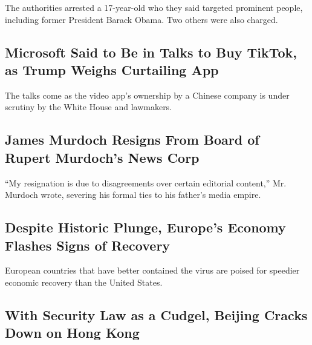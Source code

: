 The authorities arrested a 17-year-old who they said targeted prominent
people, including former President Barack Obama. Two others were also
charged.

\href{/2020/07/31/technology/tiktok-microsoft.html}{}

\hypertarget{microsoft-said-to-be-in-talks-to-buy-tiktok-as-trump-weighs-curtailing-app}{%
\subsection{Microsoft Said to Be in Talks to Buy TikTok, as Trump Weighs
Curtailing
App}\label{microsoft-said-to-be-in-talks-to-buy-tiktok-as-trump-weighs-curtailing-app}}

The talks come as the video app's ownership by a Chinese company is
under scrutiny by the White House and lawmakers.

\href{/2020/07/31/business/media/james-murdoch-resigns-news-corp.html}{}

\hypertarget{james-murdoch-resigns-from-board-of-rupert-murdochs-news-corp}{%
\subsection{James Murdoch Resigns From Board of Rupert Murdoch's News
Corp}\label{james-murdoch-resigns-from-board-of-rupert-murdochs-news-corp}}

``My resignation is due to disagreements over certain editorial
content,'' Mr. Murdoch wrote, severing his formal ties to his father's
media empire.

\href{/2020/07/31/business/europe-economy-recovery-coronavirus.html}{}

\hypertarget{despite-historic-plunge-europes-economy-flashes-signs-of-recovery}{%
\subsection{Despite Historic Plunge, Europe's Economy Flashes Signs of
Recovery}\label{despite-historic-plunge-europes-economy-flashes-signs-of-recovery}}

European countries that have better contained the virus are poised for
speedier economic recovery than the United States.

\href{/2020/07/31/world/asia/hong-kong-election-national-security-law.html}{}

\hypertarget{with-security-law-as-a-cudgel-beijing-cracks-down-on-hong-kong}{%
\subsection{With Security Law as a Cudgel, Beijing Cracks Down on Hong
Kong}\label{with-security-law-as-a-cudgel-beijing-cracks-down-on-hong-kong}}

